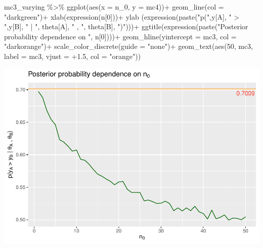 \documentclass[
  11pt,
]{article}
\newenvironment{Shaded}{\begin{snugshade}}{\end{snugshade}}
\newcommand{\AttributeTok}[1]{\textcolor[rgb]{0.77,0.63,0.00}{#1}}
\newcommand{\DecValTok}[1]{\textcolor[rgb]{0.00,0.00,0.81}{#1}}
\newcommand{\FloatTok}[1]{\textcolor[rgb]{0.00,0.00,0.81}{#1}}
\newcommand{\FunctionTok}[1]{\textcolor[rgb]{0.00,0.00,0.00}{#1}}
\newcommand{\NormalTok}[1]{#1}
\newcommand{\SpecialCharTok}[1]{\textcolor[rgb]{0.00,0.00,0.00}{#1}}
\newcommand{\StringTok}[1]{\textcolor[rgb]{0.31,0.60,0.02}{#1}}
\begin{document}
\begin{Shaded}
\begin{Highlighting}[]
\NormalTok{mc3\_varying }\SpecialCharTok{\%\textgreater{}\%} \FunctionTok{ggplot}\NormalTok{(}\FunctionTok{aes}\NormalTok{(}\AttributeTok{x =}\NormalTok{ n\_0, }\AttributeTok{y =}\NormalTok{ mc4))}\SpecialCharTok{+}
  \FunctionTok{geom\_line}\NormalTok{(}\AttributeTok{col =} \StringTok{"darkgreen"}\NormalTok{)}\SpecialCharTok{+}
  \FunctionTok{xlab}\NormalTok{(}\FunctionTok{expression}\NormalTok{(n[}\DecValTok{0}\NormalTok{]))}\SpecialCharTok{+}
  \FunctionTok{ylab}\NormalTok{ (}\FunctionTok{expression}\NormalTok{(}\FunctionTok{paste}\NormalTok{(}\StringTok{"p("}\NormalTok{,y[A], }\StringTok{" \textgreater{} "}\NormalTok{,y[B], }\StringTok{" | "}\NormalTok{, theta[A], }\StringTok{" , "}\NormalTok{, theta[B], }\StringTok{")"}\NormalTok{)))}\SpecialCharTok{+}
  \FunctionTok{ggtitle}\NormalTok{(}\FunctionTok{expression}\NormalTok{(}\FunctionTok{paste}\NormalTok{(}\StringTok{"Posterior probability dependence on "}\NormalTok{, n[}\DecValTok{0}\NormalTok{])))}\SpecialCharTok{+}
  \FunctionTok{geom\_hline}\NormalTok{(}\AttributeTok{yintercept =}\NormalTok{ mc3, }\AttributeTok{col =} \StringTok{"darkorange"}\NormalTok{)}\SpecialCharTok{+}
  \FunctionTok{scale\_color\_discrete}\NormalTok{(}\AttributeTok{guide =} \StringTok{"none"}\NormalTok{)}\SpecialCharTok{+}
  \FunctionTok{geom\_text}\NormalTok{(}\FunctionTok{aes}\NormalTok{(}\DecValTok{50}\NormalTok{, mc3, }\AttributeTok{label =}\NormalTok{ mc3, }\AttributeTok{vjust =} \SpecialCharTok{+}\FloatTok{1.5}\NormalTok{, }\AttributeTok{col =} \StringTok{"orange"}\NormalTok{))}
\end{Highlighting}
\end{Shaded}

\begin{center}\includegraphics[width=0.6\linewidth]{1_hw_bs_code_files/figure-latex/unnamed-chunk-6-1} \end{center}
\normalsize
\end{document}
